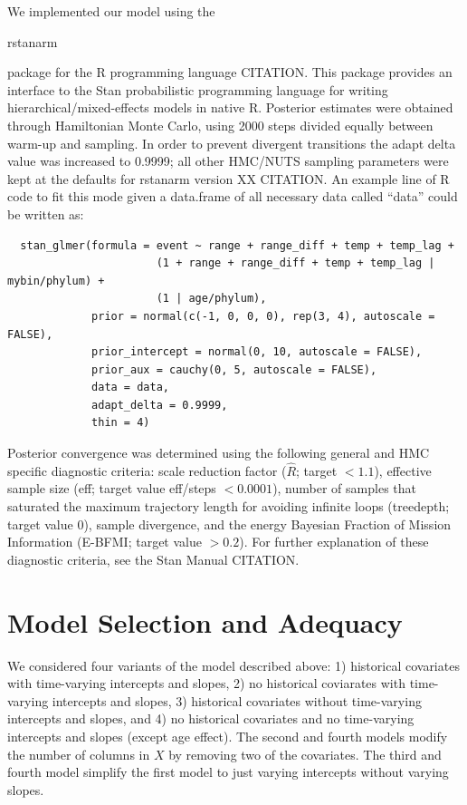 \documentclass[12pt,letterpaper]{article}
\begin{document}
We implemented our model using the \begin{texttt}rstanarm\end{texttt} package for the R programming language CITATION. This package provides an interface to the Stan probabilistic programming language for writing hierarchical/mixed-effects models in native R. Posterior estimates were obtained through Hamiltonian Monte Carlo, using 2000 steps divided equally between warm-up and sampling. In order to prevent divergent transitions the adapt delta value was increased to 0.9999; all other HMC/NUTS sampling parameters were kept at the defaults for rstanarm version XX CITATION. An example line of R code to fit this mode given a data.frame of all necessary data called ``data'' could be written as:
\begin{verbatim}
  stan_glmer(formula = event ~ range + range_diff + temp + temp_lag + 
                       (1 + range + range_diff + temp + temp_lag | mybin/phylum) + 
                       (1 | age/phylum), 
             prior = normal(c(-1, 0, 0, 0), rep(3, 4), autoscale = FALSE), 
             prior_intercept = normal(0, 10, autoscale = FALSE), 
             prior_aux = cauchy(0, 5, autoscale = FALSE), 
             data = data, 
             adapt_delta = 0.9999, 
             thin = 4)
\end{verbatim}

Posterior convergence was determined using the following general and HMC specific diagnostic criteria: scale reduction factor (\(\hat{R}\); target \(<1.1\)), effective sample size (eff; target value eff/steps \(<0.0001\)), number of samples that saturated the maximum trajectory length for avoiding infinite loops (treedepth; target value 0), sample divergence, and the energy Bayesian Fraction of Mission Information (E-BFMI; target value \(>0.2\)). For further explanation of these diagnostic criteria, see the Stan Manual CITATION.


\section{Model Selection and Adequacy}

We considered four variants of the model described above: 1) historical covariates with time-varying intercepts and slopes, 2) no historical coviarates with time-varying intercepts and slopes, 3) historical covariates without time-varying intercepts and slopes, and 4) no historical covariates and no time-varying intercepts and slopes (except age effect). The second and fourth models modify the number of columns in \(X\) by removing two of the covariates. The third and fourth model simplify the first model to just varying intercepts without varying slopes.
\end{document}
